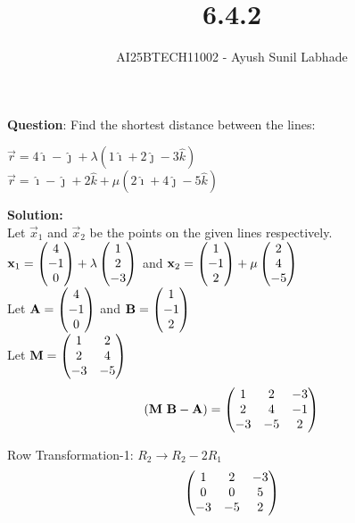 \documentclass{beamer}
\begin{document}
\title{6.4.2}
\author{AI25BTECH11002 - Ayush Sunil Labhade}
{\let\newpage\relax\maketitle}


\textbf{Question}: Find the shortest distance between the lines:\\
\begin{center}
	$\vec{r} = 4\hat{\imath} - \hat{\jmath} + \lambda(1\hat{\imath} + 2\hat{\jmath} -3\hat{k})$\\
$\vec{r} = \hat{\imath} - \hat{\jmath} + 2\hat{k}+ \mu(2\hat{\imath} + 4\hat{\jmath} -5\hat{k})$
\end{center}



\textbf{Solution:}\\
Let $\vec{x}_1$ and $\vec{x}_2$ be the points on the given lines respectively.\\
$\mathbf{x}_1 = \begin{pmatrix}4 \\ -1 \\ 0\end{pmatrix} + \lambda\begin{pmatrix}1 \\ 2 \\ -3\end{pmatrix}$ and $\mathbf{x}_2 = \begin{pmatrix}1 \\ -1 \\ 2\end{pmatrix} + \mu\begin{pmatrix}2 \\ 4 \\ -5\end{pmatrix}$\\
Let $\mathbf{A} = \begin{pmatrix}4 \\ -1 \\ 0\end{pmatrix}$ and $\mathbf{B} = \begin{pmatrix}1 \\ -1 \\ 2\end{pmatrix}$\\
Let $\mathbf{M} = \begin{pmatrix}1 & 2 \\ 2 & 4 \\ -3 & -5\end{pmatrix}$\\

\begin{align}
(\mathbf{M} \, \, \mathbf{B}-\mathbf{A}) = \begin{pmatrix}1 & 2 & -3 \\ 2 & 4 & -1 \\ -3 & -5 & 2\end{pmatrix}
\end{align}

Row Transformation-1: $R_2 \rightarrow R_2 - 2R_1$
\begin{align}
\begin{pmatrix}1 & 2 & -3 \\ 0 & 0 & 5 \\ -3 & -5 & 2\end{pmatrix}
\end{align}
\end{document}
